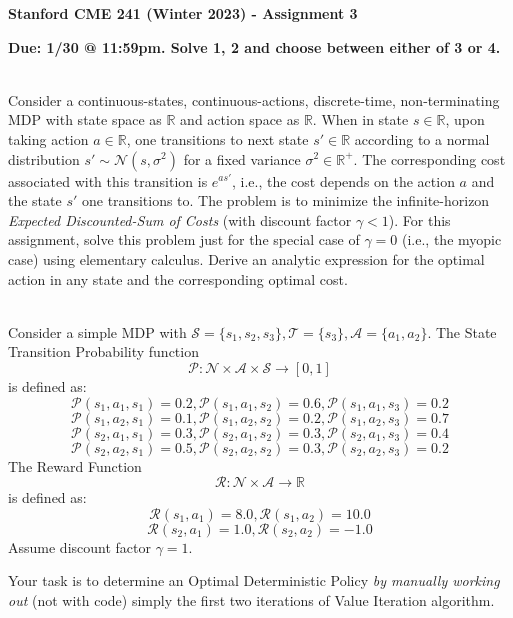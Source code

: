 \documentclass[12pt]{exam}
\begin{document}
\begin{center}
{\large {\bf Stanford CME 241 (Winter 2023) - Assignment 3}}
\end{center}
 
{\large{\bf Due: 1/30 @ 11:59pm. Solve 1, 2 and choose between either of 3 or 4.}}
\begin{questions}

 \\ Consider a continuous-states, continuous-actions, discrete-time, non-terminating MDP with state space as $\mathbb{R}$ and action space as $\mathbb{R}$. When in state $s\in \mathbb{R}$, upon taking action $a\in \mathbb{R}$, one transitions to next state $s' \in \mathbb{R}$ according to a normal distribution $s' \sim \mathcal{N}(s, \sigma^2)$ for a fixed variance $\sigma^2 \in \mathbb{R}^+$. The corresponding cost associated with this transition is $e^{as'}$, i.e., the cost depends on the action $a$ and the state $s'$ one transitions to. The problem is to minimize the infinite-horizon {\em Expected Discounted-Sum of Costs} (with discount factor $\gamma < 1$). For this assignment, solve this problem just for the special case of $\gamma = 0$ (i.e., the myopic case) using elementary calculus. Derive an analytic expression for the optimal action in any state and the corresponding optimal cost.

  \\Consider a simple MDP with $\mathcal{S} = \{s_1, s_2, s_3\}, \mathcal{T} =\{s_3\}, \mathcal{A} = \{a_1, a_2\}$. The State Transition Probability function
$$\mathcal{P}: \mathcal{N} \times \mathcal{A} \times \mathcal{S} \rightarrow [0, 1]$$
is defined as:
$$\mathcal{P}(s_1, a_1, s_1) = 0.2, \mathcal{P}(s_1, a_1, s_2) = 0.6, \mathcal{P}(s_1, a_1, s_3) = 0.2$$
$$\mathcal{P}(s_1, a_2, s_1) = 0.1, \mathcal{P}(s_1, a_2, s_2) = 0.2, \mathcal{P}(s_1, a_2, s_3) = 0.7$$
$$\mathcal{P}(s_2, a_1, s_1) = 0.3, \mathcal{P}(s_2, a_1, s_2) = 0.3, \mathcal{P}(s_2, a_1, s_3) = 0.4$$
$$\mathcal{P}(s_2, a_2, s_1) = 0.5, \mathcal{P}(s_2, a_2, s_2) = 0.3, \mathcal{P}(s_2, a_2, s_3) = 0.2$$
The Reward Function 
$$\mathcal{R}: \mathcal{N} \times \mathcal{A} \rightarrow \mathbb{R}$$
is defined as:
$$\mathcal{R}(s_1, a_1) = 8.0, \mathcal{R}(s_1, a_2) = 10.0$$
$$\mathcal{R}(s_2, a_1) = 1.0, \mathcal{R}(s_2, a_2) = -1.0$$
Assume discount factor $\gamma = 1$.

Your task is to determine an Optimal Deterministic Policy {\em by manually working out} (not with code) simply the first two iterations of Value Iteration algorithm. 


\end{questions}
\end{document}
